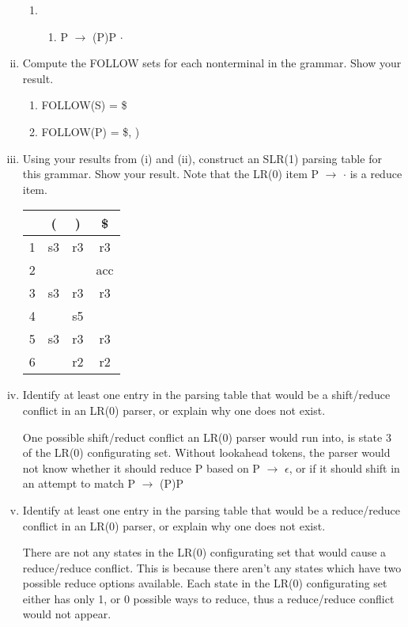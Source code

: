 \documentclass{article}
\begin{document}
\begin{enumerate}[i.]
\begin{enumerate}[(1)]
			\item \begin{enumerate}[]
				\item P $\to$ (P)P $\cdot$
			\end{enumerate}
		\end{enumerate}

	\item Compute the FOLLOW sets for each nonterminal in the grammar. Show
		your result.

		\begin{enumerate}[(1)]
			\item FOLLOW(S) = \$
			\item FOLLOW(P) = \$, )
		\end{enumerate}

	\item Using your results from (i) and (ii), construct an SLR(1) parsing
		table for this grammar. Show your result. Note that the LR(0)
		item P $\to$ $\cdot$ is a reduce item.

		\begin{tabular}{|c|c|c|c|}
		                             \hline
			  &  ( &  ) & \$  \\ \hline
			1 & s3 & r3 & r3  \\ \hline
			2 &    &    & acc \\ \hline
			3 & s3 & r3 & r3  \\ \hline
			4 &    & s5 &     \\ \hline
			5 & s3 & r3 & r3  \\ \hline
			6 &    & r2 & r2  \\ \hline
		\end{tabular}

	\item Identify at least one entry in the parsing table that would be a
		shift/reduce conflict in an LR(0) parser, or explain why one
		does not exist.

		One possible shift/reduct conflict an LR(0) parser would run
		into, is state 3 of the LR(0) configurating set. Without
		lookahead tokens, the parser would not know whether it should
		reduce P based on P $\to$ $\epsilon$, or if it should shift in
		an attempt to match P $\to$ (P)P

	\item Identify at least one entry in the parsing table that would be a
		reduce/reduce conflict in an LR(0) parser, or explain why one
		does not exist.

		There are not any states in the LR(0) configurating set that
		would cause a reduce/reduce conflict. This is because there
		aren't any states which have two possible reduce options
		available. Each state in the LR(0) configurating set either has
		only 1, or 0 possible ways to reduce, thus a reduce/reduce
		conflict would not appear.
\end{enumerate}
\end{document}
